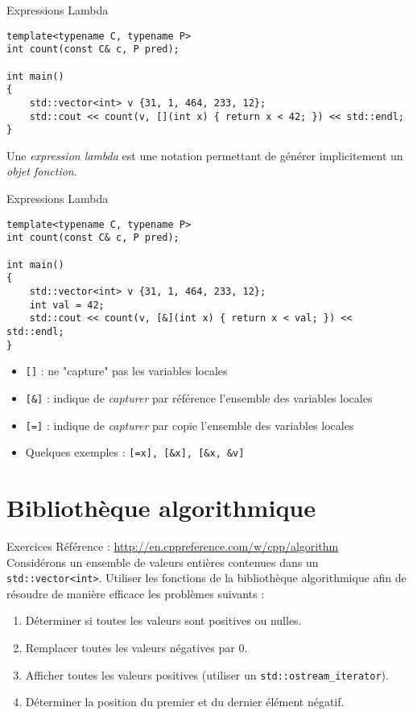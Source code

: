 \documentclass[handout]{beamer}
\begin{document}
\begin{frame}[fragile]{Expressions Lambda}
    \begin{lstlisting}
template<typename C, typename P>
int count(const C& c, P pred);

int main()
{
    std::vector<int> v {31, 1, 464, 233, 12};
    std::cout << count(v, [](int x) { return x < 42; }) << std::endl;
}
    \end{lstlisting}

    Une \textit{expression lambda} est une notation permettant de générer implicitement
    un \textit{objet fonction}.
\end{frame}

\begin{frame}[fragile]{Expressions Lambda}
    \begin{lstlisting}
template<typename C, typename P>
int count(const C& c, P pred);

int main()
{
    std::vector<int> v {31, 1, 464, 233, 12};
    int val = 42;
    std::cout << count(v, [&](int x) { return x < val; }) << std::endl;
}
    \end{lstlisting}

    \begin{itemize}
        \item \lstinline{[]} : ne "capture" pas les variables locales
        \item \lstinline{[&]} : indique de \textit{capturer} par référence l'ensemble des variables locales
        \item \lstinline{[=]} : indique de \textit{capturer} par copie l'ensemble des variables locales
        \item Quelques exemples : \lstinline{[=x], [&x], [&x, &v]} 
    \end{itemize}
\end{frame}


\section{Bibliothèque algorithmique}

\begin{frame}[fragile]{Exercices}
    Référence : \url{http://en.cppreference.com/w/cpp/algorithm}\\
    \vfill
    Considérons un ensemble de valeurs entières contenues dans un \lstinline{std::vector<int>}. Utiliser les fonctions de la bibliothèque algorithmique afin de résoudre de manière efficace les problèmes suivants :
    \begin{enumerate}
        \item Déterminer si toutes les valeurs sont positives ou nulles.
        \item Remplacer toutes les valeurs négatives par 0.
        \item Afficher toutes les valeurs positives (utiliser un \lstinline{std::ostream_iterator}).
        \item Déterminer la position du premier et du dernier élément négatif.
    \end{enumerate}
\end{frame}
\end{document}
